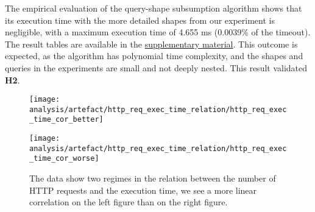  


The empirical evaluation of the query-shape subsumption algorithm shows that its execution time with the more detailed shapes from our experiment is negligible, with a maximum execution time of 4.655 ms (0.0039\% of the timeout).
The result tables are available in the \hyperref[sec:supplementalMaterial]{supplementary material}.
This outcome is expected, as the algorithm has polynomial time complexity, and the shapes and queries in the experiments are small and not deeply nested.
This result validated \textbf{H2}.

\iffalse
\begin{figure}[htbp]
    \centering
    \begin{minipage}[t]{0.40\linewidth}
        \centering
        \texttt{[image: analysis/artefact/http\_req\_exec\_time\_relation/http\_req\_exec\_time\_cor\_better]}
        \label{fig:http_req_exec_time_cor_better}
    \end{minipage}
    \hspace{0.05\textwidth}
    \begin{minipage}[t]{0.40\linewidth}
        \centering
        \texttt{[image: analysis/artefact/http\_req\_exec\_time\_relation/http\_req\_exec\_time\_cor\_worse]}
        \label{fig:http_req_exec_time_cor_worse}
    \end{minipage}

    \caption{
        The data show two regimes in the relation between the number of HTTP requests and the execution time, 
        we see a more linear correlation on the left figure than on the right figure.
        }
    \label{fig:http_req_exec_time_cor}
\end{figure}


